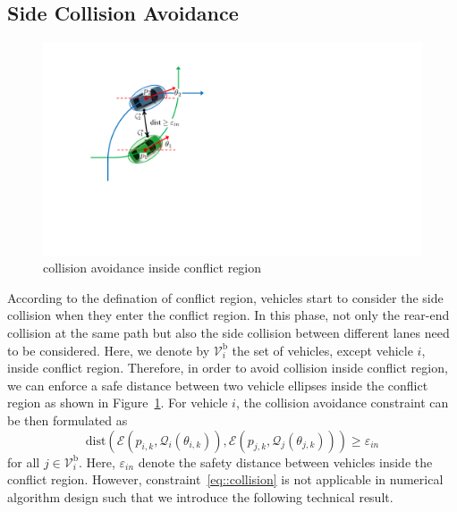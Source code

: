 \documentclass[letterpaper, 10 pt, conference]{ieeeconf}
\begin{document}
\subsection{Side Collision Avoidance}
\begin{figure}[htbp!]
	\centering
	\includegraphics[width = 0.8\linewidth]{pic/ellipses}
	\caption{collision avoidance inside conflict region}
	\label{fig::ellipses}
\end{figure}
According to the defination of conflict region, vehicles start to consider the side collision when they enter the conflict region. In this phase, not only the rear-end collision at the same path but also the side collision between different lanes need to be considered. Here, we denote by $\mathcal{V}_i^\mathrm{b}$ the set of vehicles, except vehicle $i$, inside conflict region. Therefore, in order to avoid collision inside conflict region, we can enforce a safe distance between two vehicle ellipses inside the conflict region as shown in Figure~\ref{fig::ellipses}. For vehicle $i$, the collision avoidance constraint can be then formulated as
\begin{equation}
\label{eq::collision}
\text{dist}(\mathcal{E}(p_{i,k},\mathcal{Q}_i(\theta_{i,k})),\mathcal{E}(p_{j,k},\mathcal{Q}_j(\theta_{j,k})))\geq \varepsilon_{in}
\end{equation}
for all $j\in\mathcal{V}^\mathrm{b}_{i}$. Here, $\varepsilon_{in}$ denote the safety distance between vehicles inside the conflict region. However, constraint~\eqref{eq::collision} is not applicable in numerical algorithm design such that we introduce the following technical result.
\end{document}
